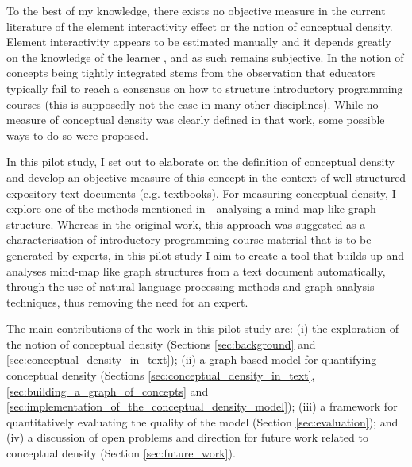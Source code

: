 \documentclass[12pt]{article}
\theoremstyle{grammarstyle}
\begin{document}
To the best of my knowledge, there exists no objective measure in the current literature of the element interactivity effect or the notion of conceptual density. Element interactivity appears to be estimated manually and it depends greatly on the knowledge of the learner \citep{chandler1996cognitive}, and as such remains subjective. In \citep{robins2010learning} the notion of concepts being tightly integrated stems from the observation that educators typically fail to reach a consensus on how to structure introductory programming courses (this is supposedly not the case in many other disciplines). While no measure of conceptual density was clearly defined in that work, some possible ways to do so were proposed.

In this pilot study, I set out to elaborate on the definition of conceptual density and develop an objective measure of this concept in the context of well-structured expository text documents (e.g. textbooks). For measuring conceptual density, I explore one of the methods mentioned in \citep{robins2010learning} - analysing a mind-map like graph structure. Whereas in the original work, this approach was suggested as a characterisation of introductory programming course material that is to be generated by experts, in this pilot study I aim to create a tool that builds up and analyses mind-map like graph structures from a text document automatically, through the use of natural language processing methods and graph analysis techniques, thus removing the need for an expert.

The main contributions of the work in this pilot study are:
(i) the exploration of the notion of conceptual density (Sections \ref{sec:background} and \ref{sec:conceptual_density_in_text});
(ii) a graph-based model for quantifying conceptual density (Sections \ref{sec:conceptual_density_in_text}, \ref{sec:building_a_graph_of_concepts} and \ref{sec:implementation_of_the_conceptual_density_model});
(iii) a framework for quantitatively evaluating the quality of the model (Section \ref{sec:evaluation});
and (iv) a discussion of open problems and direction for future work related to conceptual density
(Section \ref{sec:future_work}).
\end{document}
